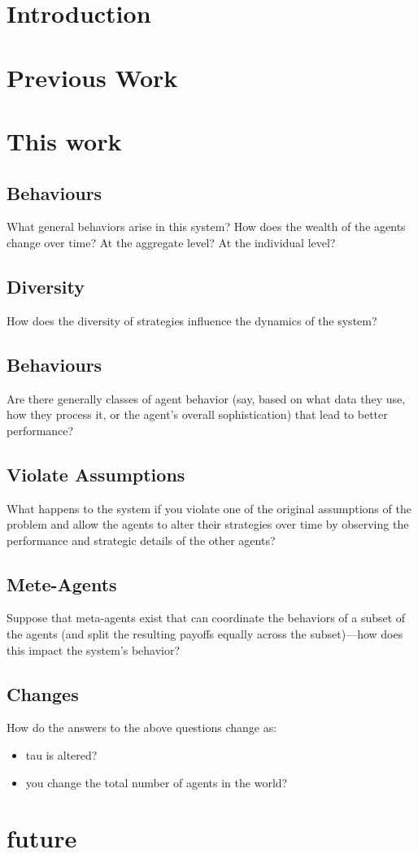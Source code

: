 \documentclass[]{article}
\title{}
\author{}
\begin{document}
\maketitle

\begin{abstract}

\end{abstract}

\section{Introduction}

\section{Previous Work}
\cite{RePEc:aea:aecrev:v:84:y:1994:i:2:p:406-11}
\cite{PAISE2007}
\cite{PAISE2009}
\section{This work}
\subsection{Behaviours}What general behaviors arise in this system?  How does the wealth of the agents change over time? At the aggregate level? At the individual level?
\subsection{Diversity}How does the diversity of strategies influence the dynamics of the system?
\subsection{Behaviours}Are there generally classes of agent behavior (say, based on what data they use, how they process it, or the agent's overall sophistication) that lead to better performance?
\subsection{Violate Assumptions}What happens to the system if you violate one of the original assumptions of the problem and allow the agents to alter their strategies over time by observing the performance and strategic details of the other agents?
\subsection{Mete-Agents}Suppose that meta-agents exist that can coordinate the behaviors of a subset of the agents (and split the resulting payoffs equally across the subset)---how does this impact the system's behavior?
\subsection{Changes}How do the answers to the above questions change as:
\begin{itemize}
	\item tau is altered?
	\item you change the total number of agents in the world?
\end{itemize}

\section{future}

\medskip



\end{document}
